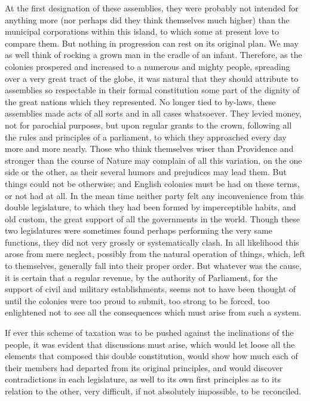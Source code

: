 At the first designation of these assemblies, they were probably not intended for anything more (nor perhaps did they think themselves much higher) than the municipal corporations within this island, to which some at present love to compare them. But nothing in progression can rest on its original plan. We may as well think of rocking a grown man in the cradle of an infant. Therefore, as the colonies prospered and increased to a numerous and mighty people, spreading over a very great tract of the globe, it was natural that they should attribute to assemblies so respectable in their formal constitution some part of the dignity of the great nations which they represented. No longer tied to by-laws, these assemblies made acts of all sorts and in all cases whatsoever. They levied money, not for parochial purposes, but upon regular grants to the crown, following all the rules and principles of a parliament, to which they approached every day more and more nearly. Those who think themselves wiser than Providence and stronger than the course of Nature may complain of all this variation, on the one side or the other, as their several humors and prejudices may lead them. But things could not be otherwise; and English colonies must be had on these terms, or not had at all. In the mean time neither party felt any inconvenience from this double legislature, to which they had been formed by imperceptible habits, and old custom, the great support of all the governments in the world. Though these two legislatures were sometimes found perhaps performing the very same functions, they did not very grossly or systematically clash. In all likelihood this arose from mere neglect, possibly from the natural operation of things, which, left to themselves, generally fall into their proper order. But whatever was the cause, it is certain that a regular revenue, by the authority of Parliament, for the support of civil and military establishments, seems not to have been thought of until the colonies were too proud to submit, too strong to be forced, too enlightened not to see all the consequences which must arise from such a system.

If ever this scheme of taxation was to be pushed against the inclinations of the people, it was evident that discussions must arise, which would let loose all the elements that composed this double constitution, would show how much each of their members had departed from its original principles, and would discover contradictions in each legislature, as well to its own first principles as to its relation to the other, very difficult, if not absolutely impossible, to be reconciled.

